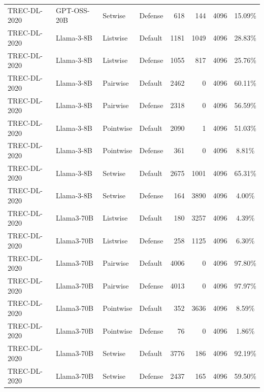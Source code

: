 \begin{table}[t]
\begin{tabular}{ll l l r r r c}
TREC-DL-2020 & GPT-OSS-20B & Setwise & Defense & 618 & 144 & 4096 & 15.09\% \\
TREC-DL-2020 & Llama-3-8B & Listwise & Default & 1181 & 1049 & 4096 & 28.83\% \\
TREC-DL-2020 & Llama-3-8B & Listwise & Defense & 1055 & 817 & 4096 & 25.76\% \\
TREC-DL-2020 & Llama-3-8B & Pairwise & Default & 2462 & 0 & 4096 & 60.11\% \\
TREC-DL-2020 & Llama-3-8B & Pairwise & Defense & 2318 & 0 & 4096 & 56.59\% \\
TREC-DL-2020 & Llama-3-8B & Pointwise & Default & 2090 & 1 & 4096 & 51.03\% \\
TREC-DL-2020 & Llama-3-8B & Pointwise & Defense & 361 & 0 & 4096 & 8.81\% \\
TREC-DL-2020 & Llama-3-8B & Setwise & Default & 2675 & 1001 & 4096 & 65.31\% \\
TREC-DL-2020 & Llama-3-8B & Setwise & Defense & 164 & 3890 & 4096 & 4.00\% \\
TREC-DL-2020 & Llama3-70B & Listwise & Default & 180 & 3257 & 4096 & 4.39\% \\
TREC-DL-2020 & Llama3-70B & Listwise & Defense & 258 & 1125 & 4096 & 6.30\% \\
TREC-DL-2020 & Llama3-70B & Pairwise & Default & 4006 & 0 & 4096 & 97.80\% \\
TREC-DL-2020 & Llama3-70B & Pairwise & Defense & 4013 & 0 & 4096 & 97.97\% \\
TREC-DL-2020 & Llama3-70B & Pointwise & Default & 352 & 3636 & 4096 & 8.59\% \\
TREC-DL-2020 & Llama3-70B & Pointwise & Defense & 76 & 0 & 4096 & 1.86\% \\
TREC-DL-2020 & Llama3-70B & Setwise & Default & 3776 & 186 & 4096 & 92.19\% \\
TREC-DL-2020 & Llama3-70B & Setwise & Defense & 2437 & 165 & 4096 & 59.50\% \\
\bottomrule
\end{tabular}
\end{table}

